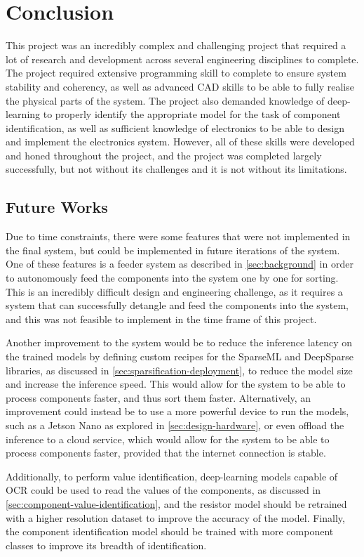 \section{Conclusion}
\label{sec:conclusion}

This project was an incredibly complex and challenging project that required a lot of research and development across several engineering disciplines to complete. The project required extensive programming skill to complete to ensure system stability and coherency, as well as advanced CAD skills to be able to fully realise the physical parts of the system. The project also demanded knowledge of deep-learning to properly identify the appropriate model for the task of component identification, as well as sufficient knowledge of electronics to be able to design and implement the electronics system. However, all of these skills were developed and honed throughout the project, and the project was completed largely successfully, but not without its challenges and it is not without its limitations.

\subsection{Future Works}
Due to time constraints, there were some features that were not implemented in the final system, but could be implemented in future iterations of the system. One of these features is a feeder system as described in \autoref{sec:background} in order to autonomously feed the components into the system one by one for sorting. This is an incredibly difficult design and engineering challenge, as it requires a system that can successfully detangle and feed the components into the system, and this was not feasible to implement in the time frame of this project.

Another improvement to the system would be to reduce the inference latency on the trained models by defining custom recipes for the SparseML and DeepSparse libraries, as discussed in \autoref{sec:sparsification-deployment}, to reduce the model size and increase the inference speed. This would allow for the system to be able to process components faster, and thus sort them faster. Alternatively, an improvement could instead be to use a more powerful device to run the models, such as a Jetson Nano as explored in \autoref{sec:design-hardware}, or even offload the inference to a cloud service, which would allow for the system to be able to process components faster, provided that the internet connection is stable.

Additionally, to perform value identification, deep-learning models capable of OCR could be used to read the values of the components, as discussed in \autoref{sec:component-value-identification}, and the resistor model should be retrained with a higher resolution dataset to improve the accuracy of the model. Finally, the component identification model should be trained with more component classes to improve its breadth of identification.
